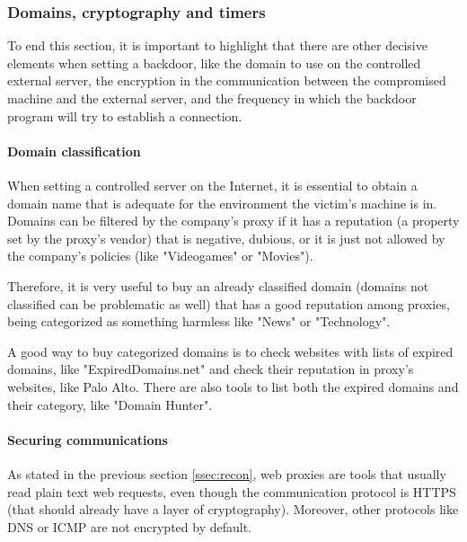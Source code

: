 \subsubsection{Domains, cryptography and timers}
To end this section, it is important to highlight that there are other decisive elements when setting a backdoor, like the domain to use on the controlled external server, the encryption in the communication between the compromised machine and the external server, and the frequency in which the backdoor program will try to establish a connection.

\paragraph{Domain classification}
When setting a controlled server on the Internet, it is essential to obtain a domain name that is adequate for the environment the victim's machine is in. Domains can be filtered by the company's proxy if it has a reputation (a property set by the proxy's vendor) that is negative, dubious, or it is just not allowed by the company's policies (like "Videogames" or "Movies"). 

Therefore, it is very useful to buy an already classified domain (domains not classified can be problematic as well) that has a good reputation among proxies, being categorized as something harmless like "News" or "Technology".

A good way to buy categorized domains is to check websites with lists of expired domains, like "ExpiredDomains.net"\cite{ExpiredDomainsWeb} and check their reputation in proxy's websites, like Palo Alto\cite{PaloAltoFilteringWeb}. There are also tools to list both the expired domains and their category, like "Domain Hunter"\cite{DomainHunterWeb}.

\paragraph{Securing communications}
As stated in the previous section \ref{ssec:recon}, web proxies are tools that usually read plain text web requests, even though the communication protocol is HTTPS (that should already have a layer of cryptography). Moreover, other protocols like DNS or ICMP are not encrypted by default.


